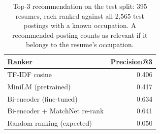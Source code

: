 \begin{table}[H]
\centering\small
\begin{tabularx}{\linewidth}{@{}L r@{}}
\toprule
Ranker & Precision@3\\
\midrule
TF-IDF cosine & 0.406\\
MiniLM (pretrained) & 0.417\\
Bi-encoder (fine-tuned) & 0.634\\
Bi-encoder + MatchNet re-rank & 0.641\\
Random ranking (expected) & 0.050\\
\bottomrule
\end{tabularx}
\caption{Top-3 recommendation on the test split: 395 resumes, each ranked against all 2,565 test postings with a known occupation. A recommended posting counts as relevant if it belongs to the resume's occupation.}\label{tab:retrieval}
\end{table}
